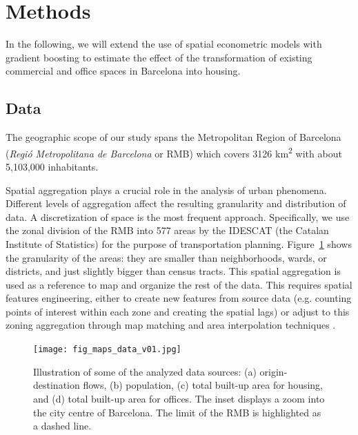 \section{Methods}
\label{sec:ETRCO2H_methods}

In the following, we will extend the use of spatial econometric models with gradient boosting to estimate the effect of the transformation of existing commercial and office spaces in Barcelona into housing. 

\subsection{Data}
\label{subsec:etrco2h_data}

The geographic scope of our study spans the Metropolitan Region of Barcelona (\emph{Regió Metropolitana de Barcelona} or RMB) which covers 3126 km\textsuperscript{2} with about 5,103,000 inhabitants.

Spatial aggregation plays a crucial role in the analysis of urban phenomena. Different levels of aggregation affect the resulting granularity and distribution of data. A discretization of space is the most frequent approach. 
Specifically, we use the zonal division of the RMB into 577 areas by the IDESCAT (the Catalan Institute of Statistics) for the purpose of transportation planning.
Figure~\ref{fig:data_maps} shows the granularity of the areas:
they are smaller than neighborhoods, wards, or districts, and just slightly bigger than census tracts. 
This spatial aggregation is used as a reference to map and organize the rest of the data. This requires spatial features engineering, either to create new features from source data (e.g. counting points of interest within each zone and creating the spatial lags) or adjust to this zoning aggregation through map matching and area interpolation techniques
\citep{Eicher2001DasymetricEvaluation, Comber2019}. 

\begin{figure}[ht!]
    \centering
    \texttt{[image: fig\_maps\_data\_v01.jpg]}
    \caption{Illustration of some of the analyzed data sources: (a) origin-destination flows, (b) population, (c) total built-up area for housing, and (d) total built-up area for offices. The inset displays a zoom into the city centre of Barcelona. The limit of the RMB is highlighted as a dashed line.}
    \label{fig:data_maps}
\end{figure}

